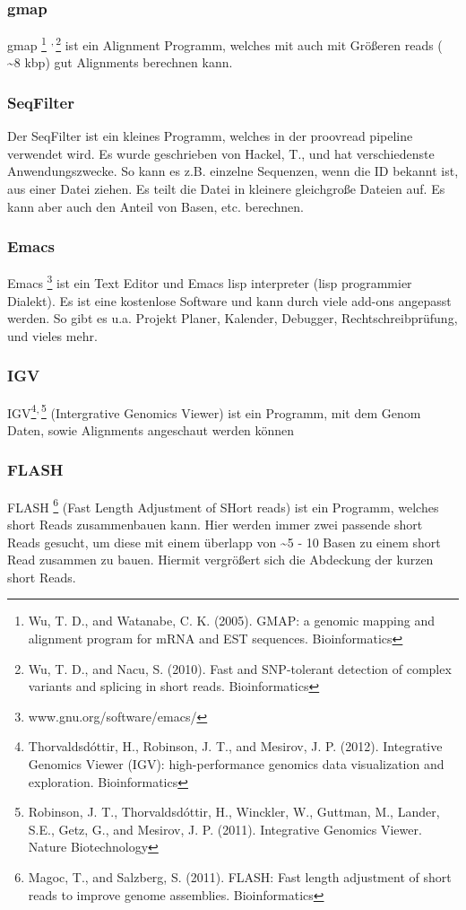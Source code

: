 \documentclass{scrartcl}
\begin{document}
\subsubsection{gmap}
\label{sec-4-3-2}
gmap \footnote{Wu, T. D., and Watanabe, C. K. (2005).
GMAP: a genomic mapping and alignment program for mRNA and EST sequences. Bioinformatics} \textsuperscript{,}\,\footnote{Wu, T. D., and Nacu, S. (2010).
Fast and SNP-tolerant detection of complex variants and splicing in short reads. Bioinformatics} ist ein Alignment Programm, welches mit auch mit Größeren reads ( \textasciitilde{}8 kbp) gut Alignments berechnen kann. 
\subsubsection{SeqFilter}
\label{sec-4-3-3}
Der SeqFilter ist ein kleines Programm, welches in der proovread pipeline verwendet wird. Es wurde geschrieben von Hackel, T., und 
hat verschiedenste Anwendungszwecke. So kann es z.B. einzelne Sequenzen, wenn die ID bekannt ist, aus einer Datei ziehen. Es teilt die Datei in 
kleinere gleichgroße Dateien auf. Es kann aber auch den Anteil von Basen, etc. berechnen.  
\subsubsection{Emacs}
\label{sec-4-3-4}
Emacs \footnote{www.gnu.org/software/emacs/} ist ein Text Editor und Emacs lisp interpreter (lisp programmier Dialekt).
Es ist eine kostenlose Software und kann durch viele add-ons angepasst werden. So gibt es u.a. Projekt Planer, Kalender, Debugger, Rechtschreibprüfung, und vieles mehr.

\subsubsection{IGV}
\label{sec-4-3-5}
IGV\footnote{Thorvaldsdóttir, H., Robinson, J. T., and Mesirov, J. P. (2012).
Integrative Genomics Viewer (IGV): high-performance genomics data visualization and exploration. Bioinformatics}\textsuperscript{,}\,\footnote{Robinson, J. T., Thorvaldsdóttir, H., Winckler, W., Guttman, M., Lander, S.E., Getz, G., and Mesirov, J. P. (2011). 
Integrative Genomics Viewer. Nature Biotechnology} (Intergrative Genomics Viewer) ist ein Programm, mit dem Genom Daten, sowie Alignments angeschaut werden können
\subsubsection{FLASH}
\label{sec-4-3-6}
FLASH \footnote{Magoc, T., and Salzberg, S. (2011).
FLASH: Fast length adjustment of short reads to improve genome assemblies. Bioinformatics} (Fast Length Adjustment of SHort reads) ist ein Programm, welches short Reads zusammenbauen kann. Hier werden immer zwei passende 
short Reads gesucht, um diese mit einem überlapp von \textasciitilde{}5 - 10 Basen zu einem short Read zusammen zu bauen. Hiermit vergrößert sich die Abdeckung
der kurzen short Reads.
\end{document}
